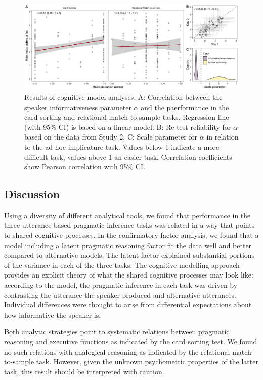 \documentclass[
  english,
  man,floatsintext]{apa6}
\begin{document}
\begin{figure}

{\centering \includegraphics[width=1\linewidth]{./figures/figure6} 

}

\caption{Results of cognitive model analyses. A: Correlation between the speaker informativeness parameter \(\alpha\) and the paerformance in the card sorting and relational match to sample tasks. Regression line (with 95\% CI) is based on a linear model. B: Re-test reliability for \(\alpha\) based on the data from Study 2. C: Scale parameter for \(\alpha\) in relation to the ad-hoc implicature task. Values below 1 indicate a more difficult task, values above 1 an easier task. Correlation coefficients show Pearson correlation with 95\% CI.}\label{fig:fig6}
\end{figure}

\hypertarget{discussion-2}{%
\subsection{Discussion}\label{discussion-2}}

Using a diversity of different analytical tools, we found that performance in the three utterance-based pragmatic inference tasks was related in a way that points to shared cognitive processes. In the confirmatory factor analysis, we found that a model including a latent pragmatic reasoning factor fit the data well and better compared to alternative models. The latent factor explained substantial portions of the variance in each of the three tasks. The cognitive modelling approach provides an explicit theory of what the shared cognitive processes may look like: according to the model, the pragmatic inference in each task was driven by contrasting the utterance the speaker produced and alternative utterances. Individual differences were thought to arise from differential expectations about how informative the speaker is.

Both analytic strategies point to systematic relations between pragmatic reasoning and executive functions as indicated by the card sorting test. We found no such relations with analogical reasoning as indicated by the relational match-to-sample task. However, given the unknown psychometric properties of the latter task, this result should be interpreted with caution.
\end{document}
